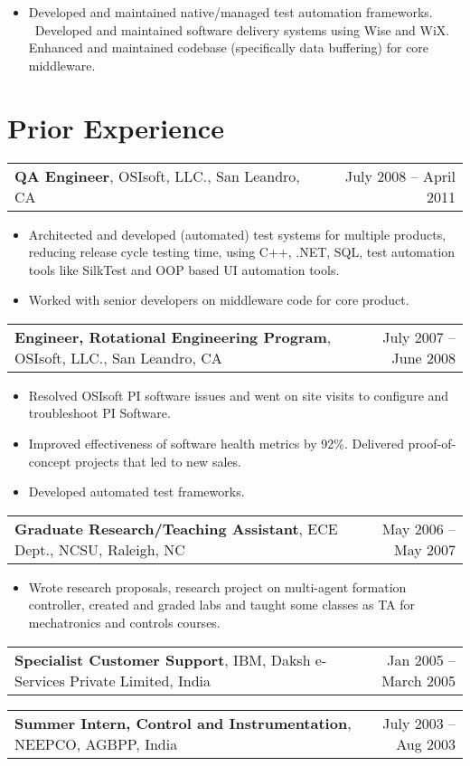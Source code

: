 \documentclass[letterpaper,10pt]{article}
\makeatletter
\newcommand{\experienceItem}[3]{
	\begin{tabular*}{\textwidth}{c@{\extracolsep{\fill}}c}
		\multicolumn{1}{l}{\textbf{#1}, #2} & \multicolumn{1}{r}{#3}\\
	\end{tabular*}\vspace{-10pt}
}
\newcommand{\resumeItemListStart}{\begin{itemize}}
\newcommand{\resumeItemListEnd}{\end{itemize}}
\newcommand{\resumeListItem}[1]{
	\item{#1 \vspace{-6pt}}
}
\makeatother
\begin{document}
	
	\resumeItemListStart
	\resumeListItem {Developed and maintained native/managed test automation frameworks. \ Developed and maintained software delivery systems using Wise and WiX. Enhanced and maintained codebase (specifically data buffering) for core middleware.}
	\resumeItemListEnd

	\section{Prior Experience}
	
	\experienceItem{QA Engineer}{OSIsoft, LLC., San Leandro, CA}{July 2008 -- April 2011}	
	\vspace{-8pt}
	\resumeItemListStart
	\resumeListItem {Architected and developed (automated) test systems for multiple products, reducing release cycle testing time, using C++, .NET, SQL, test automation tools like SilkTest and OOP based UI automation tools.}
	\resumeListItem {Worked with senior developers on middleware code for core product.}
	\resumeItemListEnd
	
	\experienceItem{Engineer, Rotational Engineering Program}{OSIsoft, LLC., San Leandro, CA}{July 2007 -- June 2008}
	\vspace{-8pt}	
	\resumeItemListStart
	\resumeListItem {Resolved OSIsoft PI software issues and went on site visits to configure and troubleshoot PI Software.}
	\resumeListItem {Improved effectiveness of software health metrics by 92\%. Delivered proof-of-concept projects that led to new sales.}
	\resumeListItem {Developed automated test frameworks.}
	\resumeItemListEnd
	
	\experienceItem{Graduate Research/Teaching Assistant}{ECE Dept., NCSU, Raleigh, NC}{May 2006 -- May 2007}
	\vspace{-8pt}
	\resumeItemListStart
	\resumeListItem {Wrote research proposals, research project on multi-agent formation controller, created and graded labs and taught some classes as TA for mechatronics and controls courses.}
	\resumeItemListEnd
	
	\experienceItem{Specialist Customer Support}{IBM, Daksh e-Services Private Limited, India}{Jan 2005 -- March 2005}
	
	\experienceItem{Summer Intern, Control and Instrumentation}{NEEPCO, AGBPP, India}{July 2003 -- Aug 2003}

\end{document}
